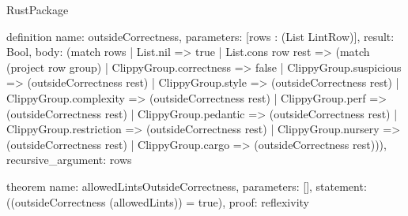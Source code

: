 \begin{lexlean}{RustPackage}
\begin{semanticmodule}
definition{
  name: outsideCorrectness,
  parameters: [rows : (List LintRow)],
  result: Bool,
  body: (match rows
    | List.nil => true
    | List.cons row rest => (match (project row group)
      | ClippyGroup.correctness => false
      | ClippyGroup.suspicious => (outsideCorrectness rest)
      | ClippyGroup.style => (outsideCorrectness rest)
      | ClippyGroup.complexity => (outsideCorrectness rest)
      | ClippyGroup.perf => (outsideCorrectness rest)
      | ClippyGroup.pedantic => (outsideCorrectness rest)
      | ClippyGroup.restriction => (outsideCorrectness rest)
      | ClippyGroup.nursery => (outsideCorrectness rest)
      | ClippyGroup.cargo => (outsideCorrectness rest))),
  recursive_argument: rows
}

theorem{
  name: allowedLintsOutsideCorrectness,
  parameters: [],
  statement: ((outsideCorrectness (allowedLints)) = true),
  proof: reflexivity{}
}
\end{semanticmodule}
\end{lexlean}

